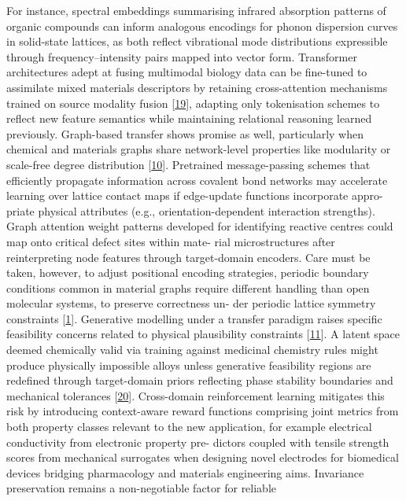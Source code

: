 \documentclass[
]{article}
\begin{document}
For instance, spectral embeddings summarising infrared absorption
patterns of organic compounds can inform analogous encodings for phonon
dispersion curves in solid-state lattices, as both reflect vibrational
mode distributions expressible through frequency--intensity pairs mapped
into vector form. Transformer architectures adept at fusing multimodal
biology data can be fine-tuned to assimilate mixed materials descriptors
by retaining cross-attention mechanisms trained on source modality
fusion {[}\protect\hyperlink{_bookmark59}{19}{]}, adapting only
tokenisation schemes to reflect new feature semantics while maintaining
relational reasoning learned previously. Graph-based transfer shows
promise as well, particularly when chemical and materials graphs share
network-level properties like modularity or scale-free degree
distribution {[}\protect\hyperlink{_bookmark50}{10}{]}. Pretrained
message-passing schemes that efficiently propagate information across
covalent bond networks may accelerate learning over lattice contact maps
if edge-update functions incorporate appro- priate physical attributes
(e.g., orientation-dependent interaction strengths). Graph attention
weight patterns developed for identifying reactive centres could map
onto critical defect sites within mate- rial microstructures after
reinterpreting node features through target-domain encoders. Care must
be taken, however, to adjust positional encoding strategies, periodic
boundary conditions common in material graphs require different handling
than open molecular systems, to preserve correctness un- der periodic
lattice symmetry constraints {[}\protect\hyperlink{_bookmark41}{1}{]}.
Generative modelling under a transfer paradigm raises specific
feasibility concerns related to physical plausibility constraints
{[}\protect\hyperlink{_bookmark51}{11}{]}. A latent space deemed
chemically valid via training against medicinal chemistry rules might
produce physically impossible alloys unless generative feasibility
regions are redefined through target-domain priors reflecting phase
stability boundaries and mechanical tolerances
{[}\protect\hyperlink{_bookmark60}{20}{]}. Cross-domain reinforcement
learning mitigates this risk by introducing context-aware reward
functions comprising joint metrics from both property classes relevant
to the new application, for example electrical conductivity from
electronic property pre- dictors coupled with tensile strength scores
from mechanical surrogates when designing novel electrodes for
biomedical devices bridging pharmacology and materials engineering aims.
Invariance preservation remains a non-negotiable factor for reliable
\end{document}
